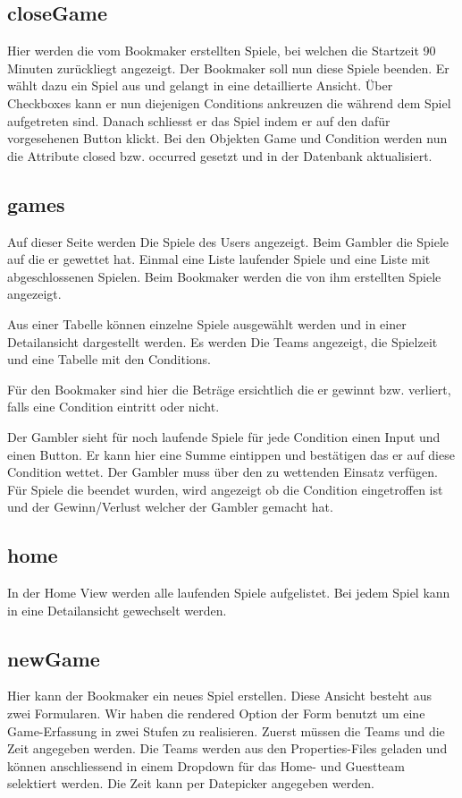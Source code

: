\documentclass[a4paper, abstracton]{scrartcl}
\begin{document}
\subsection{closeGame}
  Hier werden die vom Bookmaker erstellten Spiele, bei welchen die Startzeit
  90 Minuten zurückliegt angezeigt. Der Bookmaker soll nun diese Spiele beenden.
  Er wählt dazu ein Spiel aus und gelangt in eine detaillierte Ansicht.
  Über Checkboxes kann er nun diejenigen Conditions ankreuzen die während dem
  Spiel aufgetreten sind. Danach schliesst er das Spiel indem er auf den dafür
  vorgesehenen Button klickt.
  Bei den Objekten Game und Condition werden nun die Attribute closed bzw. occurred
  gesetzt und in der Datenbank aktualisiert.

\subsection{games}
  Auf dieser Seite werden Die Spiele des Users angezeigt.
  Beim Gambler die Spiele auf die er gewettet hat. Einmal eine Liste laufender Spiele
  und eine Liste mit abgeschlossenen Spielen.
  Beim Bookmaker werden die von ihm erstellten Spiele angezeigt.
  
  Aus einer Tabelle können einzelne Spiele ausgewählt werden und in einer Detailansicht dargestellt werden. Es werden Die Teams angezeigt, die Spielzeit und
  eine Tabelle mit den Conditions.
  
  Für den Bookmaker sind hier die Beträge ersichtlich die er gewinnt bzw. verliert,
  falls eine Condition eintritt oder nicht.
  
  Der Gambler sieht für noch laufende Spiele für jede Condition einen Input und
  einen Button. Er kann hier eine Summe eintippen und bestätigen das er auf diese
  Condition wettet. Der Gambler muss über den zu wettenden Einsatz verfügen.
  Für Spiele die beendet wurden, wird angezeigt ob die Condition eingetroffen ist
  und der Gewinn/Verlust welcher der Gambler gemacht hat.

\subsection{home}
  In der Home View werden alle laufenden Spiele aufgelistet.
  Bei jedem Spiel kann in eine Detailansicht gewechselt werden.

\subsection{newGame}
  Hier kann der Bookmaker ein neues Spiel erstellen.
  Diese Ansicht besteht aus zwei Formularen. Wir haben die rendered Option der Form
  benutzt um eine Game-Erfassung in zwei Stufen zu realisieren.
  Zuerst müssen die Teams und die Zeit angegeben werden. Die Teams werden aus den
  Properties-Files geladen und können anschliessend in einem Dropdown für das Home-
  und Guestteam selektiert werden. Die Zeit kann per Datepicker angegeben werden. 
\end{document}
